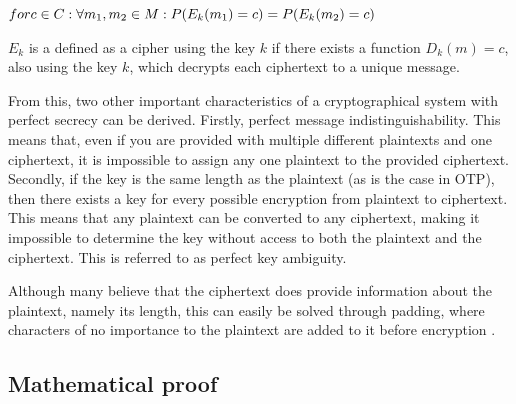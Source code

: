 \documentclass[12pt]{report}
\theoremstyle{definition}
\theoremstyle{remark}
\begin{document}
$for c \in C: \\
\forall m_1, m_2 \in M: \\
P(E_k(m_1)=c) = P(E_k(m_2)=c)$

$E_k$ is a defined as a cipher using the key $k$ if there exists a function $D_k(m)=c$, also using the key $k$, which decrypts each ciphertext to a unique message.

From this, two other important characteristics of a cryptographical system with perfect secrecy can be derived. Firstly, perfect message indistinguishability. This means that, even if you are provided with multiple different plaintexts and one ciphertext, it is impossible to assign any one plaintext to the provided ciphertext. Secondly, if the key is the same length as the plaintext (as is the case in OTP), then there exists a key for every possible encryption from plaintext to ciphertext. This means that any plaintext can be converted to any ciphertext, making it impossible to determine the key without access to both the plaintext and the ciphertext. This is referred to as perfect key ambiguity.		%

Although many believe that the ciphertext does provide information about the plaintext, namely its length, this can easily be solved through padding, where characters of no importance to the plaintext are added to it before encryption \cite{HutSix}.

\subsection{Mathematical proof}



\end{document}
